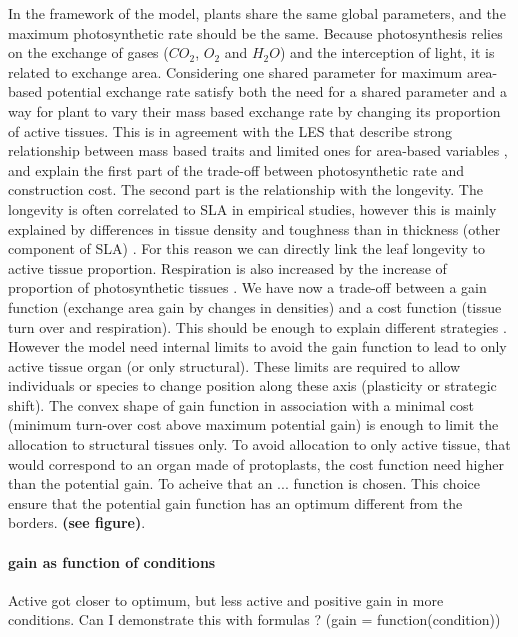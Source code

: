 In the framework of the model, plants share the same global parameters, and the maximum photosynthetic rate should be the same. Because photosynthesis relies on the exchange of gases ($CO_2$, $O_2$ and $H_2O$) and the interception of light, it is related to exchange area. Considering one shared parameter for maximum area-based potential exchange rate satisfy both the need for a shared parameter and a way for plant to vary their mass based exchange rate by changing its proportion of active tissues. This is in agreement with the LES that describe strong relationship between mass based traits and limited ones for area-based variables \cite{wright_worldwide_2004}, and explain the first part of the trade-off between photosynthetic rate and construction cost. The second part is the relationship with the longevity. The longevity is often correlated to SLA in empirical studies, however this is mainly explained by differences in tissue density and toughness than in thickness (other component of SLA) \cite{}. For this reason we can directly link the leaf longevity to active tissue proportion. Respiration is also increased by the increase of proportion of photosynthetic tissues \cite{kleidon, reich}. We have now a trade-off between a gain function (exchange area gain by changes in densities) and a cost function (tissue turn over and respiration). This should be enough to explain different strategies \cite{westoby}. However the model need internal limits to avoid the gain function to lead to only active tissue organ (or only structural). These limits are required to allow individuals or species to change position along these axis (plasticity or strategic shift). The convex shape of gain function in association with a minimal cost (minimum turn-over cost above maximum potential gain) is enough to limit the allocation to structural tissues only. To avoid allocation to only active tissue, that would correspond to an organ made of protoplasts, the cost function need higher than the potential gain. To acheive that an ... function is chosen. This choice ensure that the potential gain function has an optimum different from the borders. \textbf{(see figure)}.\\

\paragraph{gain as function of conditions}
Active got closer to optimum, but less active and positive gain in more conditions. Can I demonstrate this with formulas ? (gain = function(condition))
\\

